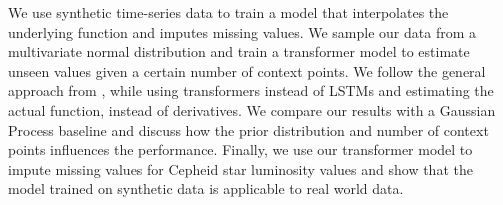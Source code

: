 We use synthetic time-series data to train a model that interpolates the underlying function and imputes missing values. We sample our data from a multivariate normal distribution and train a transformer model to estimate unseen values given a certain number of context points. We follow the general approach from \citet{seifner2025zeroshotimputationfoundationinference}, while using transformers instead of LSTMs and estimating the actual function, instead of derivatives. We compare our results with a Gaussian Process baseline and discuss how the prior distribution and number of context points influences the performance. Finally, we use our transformer model to impute missing values for Cepheid star luminosity values and show that the model trained on synthetic data is applicable to real world data.
